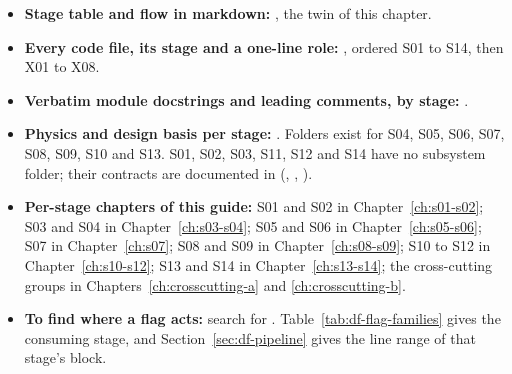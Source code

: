\begin{itemize}
  \item \textbf{Stage table and flow in markdown:} , the twin of this chapter.
  \item \textbf{Every code file, its stage and a one-line role:} , ordered S01 to S14, then X01 to X08.
  \item \textbf{Verbatim module docstrings and leading comments, by stage:} .
  \item \textbf{Physics and design basis per stage:} . Folders exist for S04, S05, S06, S07, S08, S09, S10 and S13. S01, S02, S03, S11, S12 and S14 have no subsystem folder; their contracts are documented in  (, , ).
  \item \textbf{Per-stage chapters of this guide:} S01 and S02 in Chapter~\ref{ch:s01-s02}; S03 and S04 in Chapter~\ref{ch:s03-s04}; S05 and S06 in Chapter~\ref{ch:s05-s06}; S07 in Chapter~\ref{ch:s07}; S08 and S09 in Chapter~\ref{ch:s08-s09}; S10 to S12 in Chapter~\ref{ch:s10-s12}; S13 and S14 in Chapter~\ref{ch:s13-s14}; the cross-cutting groups in Chapters~\ref{ch:crosscutting-a} and \ref{ch:crosscutting-b}.
  \item \textbf{To find where a flag acts:} search  for . Table~\ref{tab:df-flag-families} gives the consuming stage, and Section~\ref{sec:df-pipeline} gives the line range of that stage's block.
\end{itemize}
